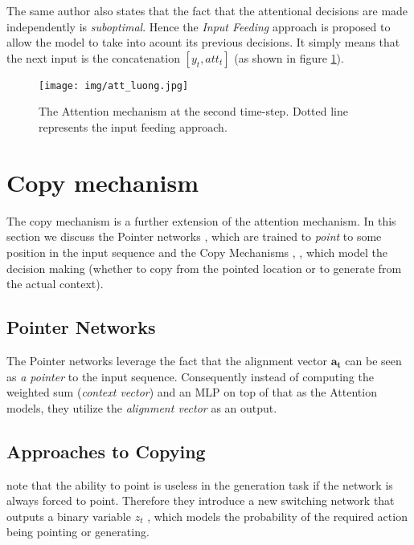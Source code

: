 The same author also states that the fact that the attentional decisions are made independently is \emph{suboptimal}. Hence the \emph{Input Feeding} approach is proposed to allow the model to take into acount its previous decisions. It simply means that the next input is the concatenation $[y_t, att_t]$ (as shown in figure \ref{figure:input_feeding_attention}).

\begin{figure}[!h]
    \centering
    \texttt{[image: img/att\_luong.jpg]}
    \caption{\centering The Attention mechanism at the second time-step. Dotted line represents the input feeding approach.} \label{figure:input_feeding_attention}
\end{figure}


\section{Copy mechanism} \label{section:copy_mechanism}
The copy mechanism is a further extension of the attention mechanism. In this section we discuss the Pointer networks \citep{vinyals2015pointer}, which are trained to \emph{point} to some position in the input sequence and the Copy Mechanisms \citep{gulcehre2016pointing}, \citep{gu2016incorporating}, \citep{yang2016referenceaware} which model the decision making (whether to copy from the pointed location or to generate from the actual context).

\subsection{Pointer Networks}

The Pointer networks \citep{vinyals2015pointer} leverage the fact that the alignment vector $\boldsymbol{a_t}$  can be seen as \emph{a pointer} to the input sequence. Consequently instead of computing the weighted sum (\emph{context vector}) and an MLP on top of that as the Attention models, they utilize the \emph{alignment vector} as an output.

\subsection{Approaches to Copying}

\citep{gulcehre2016pointing} note that the ability to point is useless in the generation task if the network is always forced to point. Therefore they introduce a new switching network that outputs a binary variable $z_t$ , which models the probability of the required action being pointing or generating.

